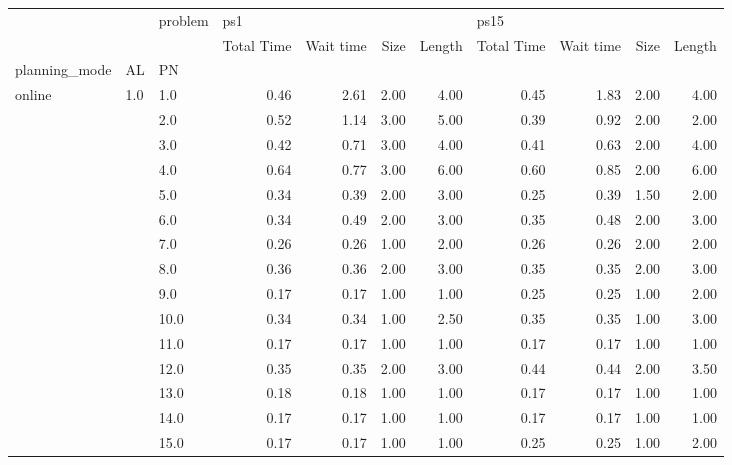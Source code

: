 \begin{tabular}{lllrrrrrrrr}
\toprule
       &     & problem & \multicolumn{4}{l}{ps1} & \multicolumn{4}{l}{ps15} \\
       &     & {} & Total Time & Wait time & Size & Length & Total Time & Wait time & Size & Length \\
planning\_mode & AL & PN &            &           &      &        &            &           &      &        \\
\midrule
online & 1.0 & 1.0  &       0.46 &      2.61 & 2.00 &   4.00 &       0.45 &      1.83 & 2.00 &   4.00 \\
       &     & 2.0  &       0.52 &      1.14 & 3.00 &   5.00 &       0.39 &      0.92 & 2.00 &   2.00 \\
       &     & 3.0  &       0.42 &      0.71 & 3.00 &   4.00 &       0.41 &      0.63 & 2.00 &   4.00 \\
       &     & 4.0  &       0.64 &      0.77 & 3.00 &   6.00 &       0.60 &      0.85 & 2.00 &   6.00 \\
       &     & 5.0  &       0.34 &      0.39 & 2.00 &   3.00 &       0.25 &      0.39 & 1.50 &   2.00 \\
       &     & 6.0  &       0.34 &      0.49 & 2.00 &   3.00 &       0.35 &      0.48 & 2.00 &   3.00 \\
       &     & 7.0  &       0.26 &      0.26 & 1.00 &   2.00 &       0.26 &      0.26 & 2.00 &   2.00 \\
       &     & 8.0  &       0.36 &      0.36 & 2.00 &   3.00 &       0.35 &      0.35 & 2.00 &   3.00 \\
       &     & 9.0  &       0.17 &      0.17 & 1.00 &   1.00 &       0.25 &      0.25 & 1.00 &   2.00 \\
       &     & 10.0 &       0.34 &      0.34 & 1.00 &   2.50 &       0.35 &      0.35 & 1.00 &   3.00 \\
       &     & 11.0 &       0.17 &      0.17 & 1.00 &   1.00 &       0.17 &      0.17 & 1.00 &   1.00 \\
       &     & 12.0 &       0.35 &      0.35 & 2.00 &   3.00 &       0.44 &      0.44 & 2.00 &   3.50 \\
       &     & 13.0 &       0.18 &      0.18 & 1.00 &   1.00 &       0.17 &      0.17 & 1.00 &   1.00 \\
       &     & 14.0 &       0.17 &      0.17 & 1.00 &   1.00 &       0.17 &      0.17 & 1.00 &   1.00 \\
       &     & 15.0 &       0.17 &      0.17 & 1.00 &   1.00 &       0.25 &      0.25 & 1.00 &   2.00 \\

\end{tabular}
